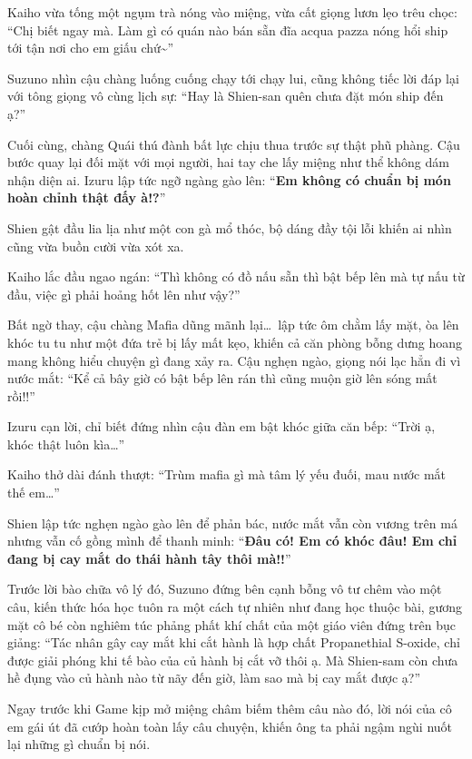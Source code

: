 \documentclass[../main.tex]{subfiles}
\begin{document}
Kaiho vừa tống một ngụm trà nóng vào miệng, vừa cất giọng lươn lẹo trêu chọc: ``Chị biết ngay mà. Làm gì có quán nào bán sẵn đĩa acqua pazza nóng hổi ship tới tận nơi cho em giấu chứ\~{}''

Suzuno nhìn cậu chàng luống cuống chạy tới chạy lui, cũng không tiếc lời đáp lại với tông giọng vô cùng lịch sự: ``Hay là Shien-san quên chưa đặt món ship đến ạ?''

Cuối cùng, chàng Quái thú đành bất lực chịu thua trước sự thật phũ phàng. Cậu bước quay lại đối mặt với mọi người, hai tay che lấy miệng như thể không dám nhận diện ai. Izuru lập tức ngỡ ngàng gào lên: ``\textbf{Em không có chuẩn bị món hoàn chỉnh thật đấy à!?}''

Shien gật đầu lia lịa như một con gà mổ thóc, bộ dáng đầy tội lỗi khiến ai nhìn cũng vừa buồn cười vừa xót xa.

Kaiho lắc đầu ngao ngán: ``Thì không có đồ nấu sẵn thì bật bếp lên mà tự nấu từ đầu, việc gì phải hoảng hốt lên như vậy?''

Bất ngờ thay, cậu chàng Mafia dũng mãnh lại\dots\ lập tức ôm chằm lấy mặt, òa lên khóc tu tu như một đứa trẻ bị lấy mất kẹo, khiến cả căn phòng bỗng dưng hoang mang không hiểu chuyện gì đang xảy ra. Cậu nghẹn ngào, giọng nói lạc hẳn đi vì nước mắt: ``Kể cả bây giờ có bật bếp lên rán thì cũng muộn giờ lên sóng mất rồi!!''


Izuru cạn lời, chỉ biết đứng nhìn cậu đàn em bật khóc giữa căn bếp: ``Trời ạ, khóc thật luôn kìa\dots''

Kaiho thở dài đánh thượt: ``Trùm mafia gì mà tâm lý yếu đuối, mau nước mắt thế em\dots''

Shien lập tức nghẹn ngào gào lên để phản bác, nước mắt vẫn còn vương trên má nhưng vẫn cố gồng mình để thanh minh: ``\textbf{Đâu có! Em có khóc đâu! Em chỉ đang bị cay mắt do thái hành tây thôi mà!!}''

Trước lời bào chữa vô lý đó, Suzuno đứng bên cạnh bỗng vô tư chêm vào một câu, kiến thức hóa học tuôn ra một cách tự nhiên như đang học thuộc bài, gương mặt cô bé còn nghiêm túc phảng phất khí chất của một giáo viên đứng trên bục giảng: ``Tác nhân gây cay mắt khi cắt hành là hợp chất Propanethial S-oxide, chỉ được giải phóng khi tế bào của củ hành bị cắt vỡ thôi ạ. Mà Shien-sam còn chưa hề đụng vào củ hành nào từ nãy đến giờ, làm sao mà bị cay mắt được ạ?''

Ngay trước khi Game kịp mở miệng châm biếm thêm câu nào đó, lời nói của cô em gái út đã cướp hoàn toàn lấy câu chuyện, khiến ông ta phải ngậm ngùi nuốt lại những gì chuẩn bị nói.
\end{document}
